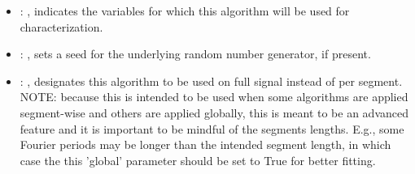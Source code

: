 \begin{itemize}
\begin{itemize}
          \item {}: ,
            indicates the variables for which this algorithm will be used for characterization.
          \item {}: ,
            sets a seed for the underlying random number generator, if present.
          \item {}: ,
            designates this algorithm to be used on full signal instead of per
            segment. NOTE: because this is intended to be used when some algorithms are
            applied segment-wise and others are applied globally, this is meant to be an
            advanced feature and it is important to be mindful of the segments lengths.
            E.g., some Fourier periods may be longer than the intended segment length, in
            which case the this 'global' parameter should be set to True for better
            fitting. 
      \end{itemize}


\end{itemize}
